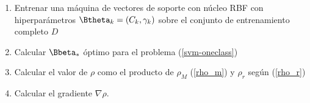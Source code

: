 \begin{enumerate}
\item Entrenar una máquina de vectores de soporte con núcleo RBF
  con hiperparámetros $\Btheta_k=(C_k,\gamma_k)$ sobre el conjunto
  de entrenamiento completo $D$
\item Calcular $\Bbeta_*$ óptimo para el problema (\ref{svm-oneclass})
\item Calcular el valor de $\rho$ como el producto de
  $\rho_M$ (\ref{rho_m}) y $\rho_r$ según (\ref{rho_r})
\item Calcular el gradiente $\nabla\rho$.
\end{enumerate}